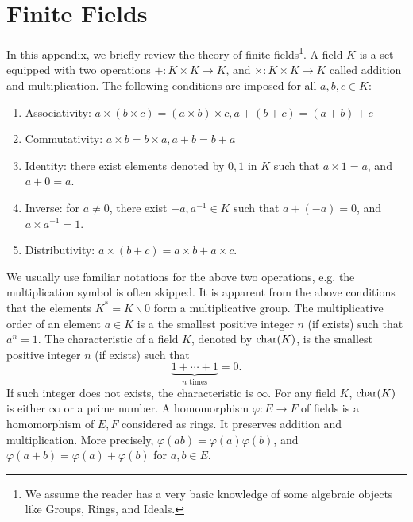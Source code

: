 \graphicspath{{finite_fields/}}


\chapter{Finite Fields}
\label{appendix:finite_fields}

In this appendix, we briefly review the theory of finite fields\footnote{We assume the reader has 
a very basic knowledge of some algebraic objects like Groups, Rings, and Ideals.}. A field $K$ is 
a set equipped with two operations $+ : K \times K \rightarrow K$, and $\times : K \times K 
\rightarrow K$ called addition and multiplication. The following conditions are imposed 
for all $a, b, c \in K$:
\begin{enumerate}
	\setlength\itemsep{0mm}
	\item Associativity: $a \times (b \times c) = (a \times b) \times c, a + (b + c) = (a + b) + c$
	\item Commutativity: $a \times b = b \times a, a + b = b + a$
	\item Identity: there exist elements denoted by $0, 1$ in $K$ such that $a \times 1 = a$, and 
	$a + 0 = a$.
	\item Inverse: for $a \ne 0$, there exist $-a, a^{-1} \in K$ such that $a + (-a) = 0$, and $a 
	\times a^{-1} =	1$.
	\item Distributivity: $a \times (b + c) = a \times b + a \times c$.
\end{enumerate}
We usually use familiar notations for the above two operations, e.g. the multiplication symbol is
often skipped. It is apparent from the above conditions that the elements $K^* = K \backslash 0$ 
form a multiplicative group. The multiplicative order of an element $a \in K$ is a the smallest 
positive integer $n$ (if exists) such that $a^n = 1$. The characteristic of a field $K$, denoted 
by $\operatorname{char}(K)$, is the smallest positive integer $n$ (if exists) such that
\[ \underbrace{1 + \cdots + 1}_{n \text{ times}} = 0. \]
If such integer does not exists, the characteristic is $\infty$. For any field $K$, 
$\operatorname{char}(K)$ is either $\infty$ or a prime number. A homomorphism $\varphi: E \rightarrow F$ of 
fields is a homomorphism of $E, F$ considered as rings. It preserves addition and multiplication. 
More precisely, $\varphi(ab) = \varphi(a)\varphi(b)$, and $\varphi(a + b) = \varphi(a) + 
\varphi(b)$ for $a, b \in E$.

